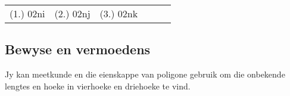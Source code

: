 \begin{exercises}{}
{%
\par \practiceinfo
\par \begin{tabular}[h]{cccccc}
(1.)	02ni	&
(2.)	02nj	&
(3.)	02nk	&
\end{tabular}
}
\end{exercises}


\subsection*{Bewyse en vermoedens}

Jy kan meetkunde en die eienskappe van poligone gebruik om die onbekende lengtes en hoeke in vierhoeke en driehoeke te vind.\par

